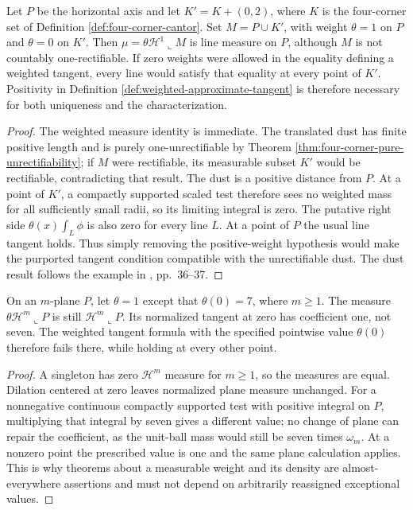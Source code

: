 \begin{example}\label{ex:zero-weight-hides-dust}
Let $P$ be the horizontal axis and let $K'=K+(0,2)$, where $K$ is the four-corner set of Definition \ref{def:four-corner-cantor}. Set $M=P\cup K'$, with weight $\theta=1$ on $P$ and $\theta=0$ on $K'$. Then $\mu=\theta\mathcal H^1\llcorner M$ is line measure on $P$, although $M$ is not countably one-rectifiable. If zero weights were allowed in the equality defining a weighted tangent, every line would satisfy that equality at every point of $K'$. Positivity in Definition \ref{def:weighted-approximate-tangent} is therefore necessary for both uniqueness and the characterization.
\end{example}
\begin{proof}
The weighted measure identity is immediate. The translated dust has finite positive length and is purely one-unrectifiable by Theorem \ref{thm:four-corner-pure-unrectifiability}; if $M$ were rectifiable, its measurable subset $K'$ would be rectifiable, contradicting that result. The dust is a positive distance from $P$. At a point of $K'$, a compactly supported scaled test therefore sees no weighted mass for all sufficiently small radii, so its limiting integral is zero. The putative right side $\theta(x)\int_L\phi$ is also zero for every line $L$. At a point of $P$ the usual line tangent holds. Thus simply removing the positive-weight hypothesis would make the purported tangent condition compatible with the unrectifiable dust. The dust result follows the example in \cite{Mor16}, pp.~36--37.
\end{proof}

\begin{example}\label{ex:null-weight-value-tangent}
On an $m$-plane $P$, let $\theta=1$ except that $\theta(0)=7$, where $m\geq1$. The measure $\theta\mathcal H^m\llcorner P$ is still $\mathcal H^m\llcorner P$. Its normalized tangent at zero has coefficient one, not seven. The weighted tangent formula with the specified pointwise value $\theta(0)$ therefore fails there, while holding at every other point.
\end{example}
\begin{proof}
A singleton has zero $\mathcal H^m$ measure for $m\geq1$, so the measures are equal. Dilation centered at zero leaves normalized plane measure unchanged. For a nonnegative continuous compactly supported test with positive integral on $P$, multiplying that integral by seven gives a different value; no change of plane can repair the coefficient, as the unit-ball mass would still be seven times $\omega_m$. At a nonzero point the prescribed value is one and the same plane calculation applies. This is why theorems about a measurable weight and its density are almost-everywhere assertions and must not depend on arbitrarily reassigned exceptional values.
\end{proof}

